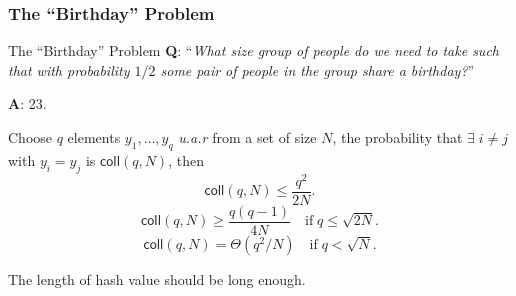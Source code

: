 \begin{frame}\frametitle{The ``Birthday'' Problem}
\begin{exampleblock}{The ``Birthday'' Problem}
\textbf{Q}: ``\emph{What size group of people do we need to take such that with probability $1/2$ some pair of people in the group share a birthday?}''

\textbf{A}: 23.
\end{exampleblock}
\begin{lemma}
Choose $q$ elements $y_1,\dotsc , y_q$ \emph{u.a.r} from a set of size $N$, the probability that $\exists \; i \ne j$ with $y_i = y_j$ is $\mathsf{coll}(q,N)$, then 
\[ \mathsf{coll}(q,N) \le \frac{q^2}{2N}.
\]
\[ \mathsf{coll}(q,N) \ge  \frac{q(q-1)}{4N}\quad \text{if}\; q \le \sqrt{2N}.
\]
\[ \mathsf{coll}(q,N) = \Theta(q^2/N)\quad \text{if}\; q < \sqrt{N}.
\]
\end{lemma}
The length of hash value should be long enough.
\end{frame}
